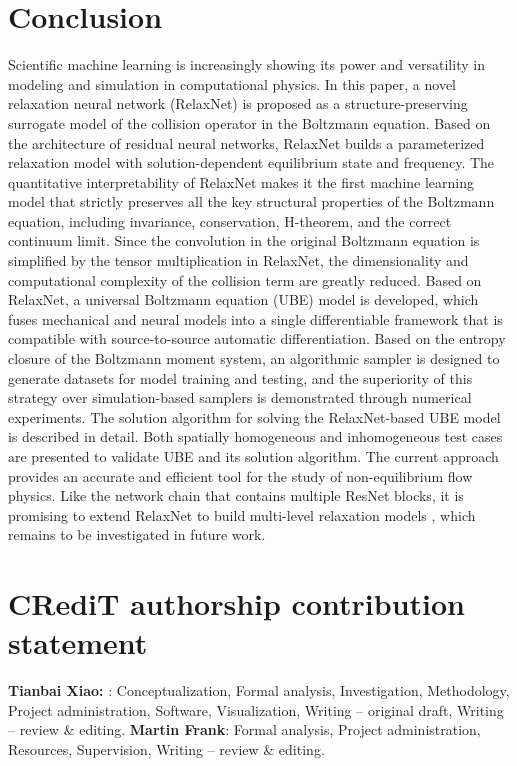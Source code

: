 \documentclass[preprint,3p,12pt,sort&compress]{elsarticle}
\begin{document}
\section*{Conclusion}

Scientific machine learning is increasingly showing its power and versatility in modeling and simulation in computational physics.
In this paper, a novel relaxation neural network (RelaxNet) is proposed as a structure-preserving surrogate model of the collision operator in the Boltzmann equation.
Based on the architecture of residual neural networks, RelaxNet builds a parameterized relaxation model with solution-dependent equilibrium state and frequency.
The quantitative interpretability of RelaxNet makes it the first machine learning model that strictly preserves all the key structural properties of the Boltzmann equation, including invariance, conservation, H-theorem, and the correct continuum limit.
Since the convolution in the original Boltzmann equation is simplified by the tensor multiplication in RelaxNet, the dimensionality and computational complexity of the collision term are greatly reduced.
Based on RelaxNet, a universal Boltzmann equation (UBE) model is developed, which fuses mechanical and neural models into a single differentiable framework that is compatible with source-to-source automatic differentiation.
Based on the entropy closure of the Boltzmann moment system, an algorithmic sampler is designed to generate datasets for model training and testing, and the superiority of this strategy over simulation-based samplers is demonstrated through numerical experiments.
The solution algorithm for solving the RelaxNet-based UBE model is described in detail.
Both spatially homogeneous and inhomogeneous test cases are presented to validate UBE and its solution algorithm. 
The current approach provides an accurate and efficient tool for the study of
non-equilibrium flow physics.
Like the network chain that contains multiple ResNet blocks, it is promising to extend RelaxNet to build multi-level relaxation models \cite{d2002multiple}, which remains to be investigated in future work.

\section*{CRediT authorship contribution statement}

\textbf{Tianbai Xiao:} : Conceptualization, Formal analysis, Investigation, Methodology, Project administration, Software, Visualization, Writing – original draft, Writing – review \& editing. \textbf{Martin Frank}: Formal analysis, Project administration, Resources, Supervision, Writing – review \& editing.
\end{document}
